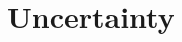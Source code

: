 \documentclass[handout]{beamer}
\begin{document}
\section{Uncertainty}
\subsection{}

\begin{comment}
\begin{frame}{Timeline}
\begin{enumerate}[<+->]
	\item \textbf{Import-competing firms lobby DOC/ITC to renew AD duties}
	\item {\color{gray} \textbf{Uncertainty is resolved}}
	\item \textbf{DOC/ITC decide whether to renew duties}
	\item {\color{gray} Private actors make production, consumption decisions}
\end{enumerate}
	
\end{frame}

\begin{frame}{Why uncertainty?}
\pause
\textbf{Government}
\pause
\begin{itemize}
	\item AD duties renewed if $G$ prefers $\tau^{\mathit{ad}}$ to $\tau^a$
\end{itemize}

\pause
\vskip.1in
\textbf{Lobby}
\pause
\begin{itemize}[<+->]
	\item Given $(\tau^a,\tau^{*a})$ and $\tau^{\mathit{ad}}$, lobby knows what $e$ is required to induce renewal
 	\item Lobby pays this $e$ if: \hskip.2in $\pi(\tau^{\mathit{ad}}) - e > \pi(\tau^a)$
\end{itemize}

\pause
\vskip.1in
\textbf{In Equilibrium}
\pause
\begin{itemize}[<+->]
	\item Firms only put forth effort when they know renewal will be granted
\end{itemize}

\end{frame}
\end{comment}
\end{document}
